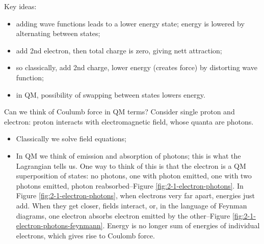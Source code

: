 \documentclass[]{article}
\begin{document}
Key ideas: 

\begin{itemize}
	\item adding wave functions leads to a lower energy state; energy is lowered by alternating between states;
	
	\item add 2nd electron, then total charge is zero, giving nett attraction; 

	\item so classically, add 2nd charge, lower energy (creates force) by distorting wave function;
	\item in QM, possibility of swapping between states lowers energy.
\end{itemize}
Can we think of Coulumb force in QM terms? Consider single proton and electron: proton interacts with electromagnetic field, whose quanta are photons.

\begin{itemize}
	\item Classically we solve field equations;
	\item In QM we think of emission and absorption of photons; this is what the Lagrangian tells us. One way to think of this is that the electron is a QM superposition of states: no photons, one with photon emitted,  one with two photons emitted, photon reabsorbed--Figure \ref{fig:2-1-electron-photons}. In Figure \ref{fig:2-1-electron-photons}, when electrons very far apart, energies just add. When they get closer, fields interact, or, in the language of Feynman diagrams, one electron absorbs electron emitted by the other--Figure \ref{fig:2-1-electron-photons-feynmann}.  Energy is no longer sum of energies of individual electrons, which gives rise to Coulomb force.
\end{itemize}
\end{document}
